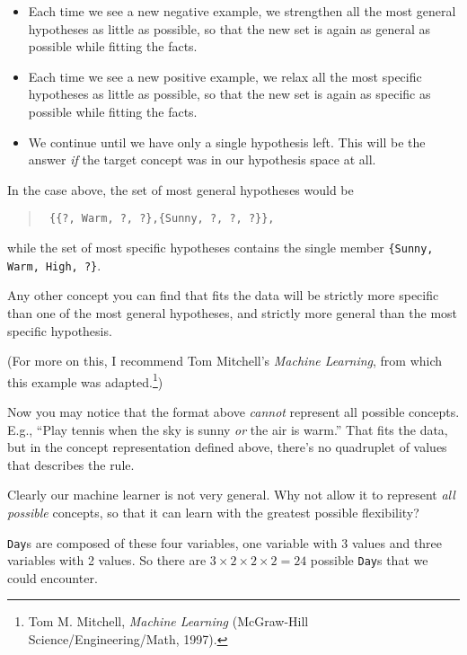 {{\begin{itemize}
\item{
 Each time we see a new negative example, we strengthen all the
most general hypotheses as little as possible, so that the new set is
again as general as possible while fitting the facts.}

\item{
 Each time we see a new positive example, we relax all the most
specific hypotheses as little as possible, so that the new set is again
as specific as possible while fitting the facts.}

\item{
 We continue until we have only a single hypothesis left. This will
be the answer \textit{if} the target concept was in our hypothesis
space at all.}
\end{itemize}

{
 In the case above, the set of most general hypotheses would be}

\begin{verse}
\texttt{  \{\{?, Warm, ?, ?\},\{Sunny, ?, ?, ?\}\},}\\
\end{verse}

{
 while the set of most specific hypotheses contains the single
member \texttt{\{Sunny, Warm, High, ?\}}. }

{
 Any other concept you can find that fits the data will be strictly
more specific than one of the most general hypotheses, and strictly
more general than the most specific hypothesis.}

{
 (For more on this, I recommend Tom Mitchell's
\textit{Machine Learning}, from which this example was
adapted.\footnote{Tom M. Mitchell, \textit{Machine Learning} (McGraw-Hill
Science/Engineering/Math, 1997).})}

{
 Now you may notice that the format above \textit{cannot} represent
all possible concepts. E.g., ``Play tennis when the
sky is sunny \textit{or} the air is warm.'' That fits
the data, but in the concept representation defined above,
there's no quadruplet of values that describes the
rule.}

{
 Clearly our machine learner is not very general. Why not allow it
to represent \textit{all possible} concepts, so that it can learn with
the greatest possible flexibility?}

{
 \texttt{Day}s are composed of these four variables, one variable with 3
values and three variables with 2 values. So there are $3 \times 2
\times 2 \times 2 = 24$ possible \texttt{Day}s that we could
encounter.}

}}
